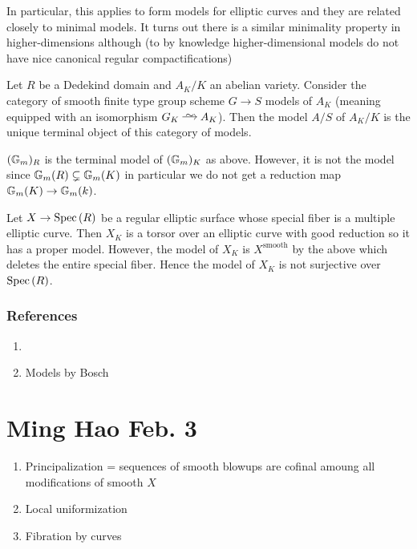 \documentclass[12pt]{article}
\begin{document}
In particular, this applies to form \Neron models for elliptic curves and they are related closely to minimal models. It turns out there is a similar minimality property in higher-dimensions although (to by knowledge higher-dimensional \Neron models do not have nice canonical regular compactifications)

\begin{theorem}
Let $R$ be a Dedekind domain and $A_K / K$ an abelian variety. Consider the category of smooth finite type group scheme $G \to S$ models of $A_K$ (meaning equipped with an isomorphism $G_K \iso A_K$). Then the \Neron model $A / S$ of $A_K / K$ is the unique terminal object of this category of models.
\end{theorem}

\begin{example}
$(\mathbb{G}_m)_R$ is the terminal model of $(\mathbb{G}_m)_K$ as above. However, it is not the \Neron model since $\mathbb{G}_m(R) \subsetneq \mathbb{G}_m(K)$ in particular we do not get a reduction map $\mathbb{G}_m(K) \to \mathbb{G}_m(k)$. 
\end{example}

\begin{example}
Let $X \to \mathrm{Spec}\left( R \right)$ be a regular elliptic surface whose special fiber is a multiple elliptic curve. Then $X_K$ is a torsor over an elliptic curve with good reduction so it has a proper \Neron model. However, the \Neron model of $X_K$ is $X^{\text{smooth}}$ by the above which deletes the entire special fiber. Hence the \Neron model of $X_K$ is not surjective over $\mathrm{Spec}\left( R \right)$.
\end{example}

\subsubsection{References}

\begin{enumerate}
\item {}
\item \Neron Models by Bosch
\end{enumerate}


\section{Ming Hao Feb. 3}

\begin{enumerate}
\item Principalization = sequences of smooth blowups are cofinal amoung all modifications of smooth $X$
\item Local uniformization
\item Fibration by curves
\end{enumerate}
\end{document}
